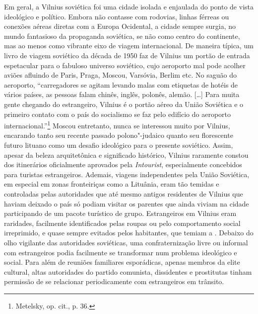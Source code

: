 Em geral, a Vilnius soviética foi uma cidade isolada e enjaulada do
ponto de vista ideológico e político. Embora não contasse com rodovias,
linhas férreas ou conexões aéreas diretas com a Europa Ocidental, a
cidade sempre surgia, no mundo fantasioso da propaganda soviética, se
não como centro do continente, mas ao menos como vibrante eixo de viagem
internacional. De maneira típica, um livro de viagem soviético da década
de 1950 faz de Vilnius um portão de entrada espetacular para o fabuloso
universo soviético, cujo aeroporto mal pode acolher aviões afluindo de
Paris, Praga, Moscou, Varsóvia, Berlim etc. No saguão do aeroporto,
``carregadores se agitam levando malas com etiquetas de hotéis de vários
países, as pessoas falam chinês, inglês, polonês, alemão. [\ldots{}] Para
muita gente chegando do estrangeiro, Vilnius é o portão aéreo da União
Soviética e o primeiro contato com o país do socialismo se faz pelo
edifício do aeroporto internacional.''\footnote{Metelsky, op. cit., p. 36.} Moscou entretanto, nunca se interessou muito por Vilnius, encarando tanto seu recente passado polono"-judaico quanto seu
florescente futuro lituano como um desafio ideológico para o presente
soviético. Assim, apesar da beleza arquitetônica e significado
histórico, Vilnius raramente constou dos itinerários oficialmente
aprovados pela \textit{Intourist}, especialmente concebidos para turistas
estrangeiros. Ademais, viagens independentes pela União Soviética, em
especial em zonas fronteiriças como a Lituânia, eram tão temidas e
controladas pelas autoridades que até mesmo antigos residentes de
Vilnius que haviam deixado o país só podiam visitar os parentes que
ainda viviam na cidade participando de um pacote turístico de grupo.
Estrangeiros em Vilnius eram raridades, facilmente identificados pelas
roupas ou pelo comportamento social irreprimido, e quase sempre evitados
pelos habitantes, que temiam a . Debaixo do olho vigilante das
autoridades soviéticas, uma confraternização livre ou informal com
estrangeiros podia facilmente se transformar num problema ideológico e
social. Para além de reuniões familiares esporádicas, apenas membros da
elite cultural, altas autoridades do partido comunista, dissidentes e
prostitutas tinham permissão de se relacionar periodicamente com
estrangeiros em trânsito.

